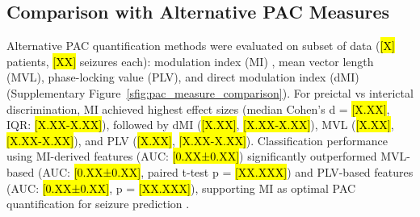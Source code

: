 \subsection{Comparison with Alternative PAC Measures}
Alternative PAC quantification methods were evaluated on subset of data (\hl{[X]} patients, \hl{[XX]} seizures each): modulation index (MI) \cite{Tort2010MeasuringPCE}, mean vector length (MVL), phase-locking value (PLV), and direct modulation index (dMI) \cite{Scherer2022DirectMIM} (Supplementary Figure~\ref{sfig:pac_measure_comparison}). For preictal vs interictal discrimination, MI achieved highest effect sizes (median Cohen's d = \hl{[X.XX]}, IQR: \hl{[X.XX-X.XX]}), followed by dMI (\hl{[X.XX]}, \hl{[X.XX-X.XX]}), MVL (\hl{[X.XX]}, \hl{[X.XX-X.XX]}), and PLV (\hl{[X.XX]}, \hl{[X.XX-X.XX]}). Classification performance using MI-derived features (AUC: \hl{[0.XX±0.XX]}) significantly outperformed MVL-based (AUC: \hl{[0.XX±0.XX]}, paired t-test p = \hl{[XX.XXX]}) and PLV-based features (AUC: \hl{[0.XX±0.XX]}, p = \hl{[XX.XXX]}), supporting MI as optimal PAC quantification for seizure prediction \cite{Hlsemann2019QuantificationOPA}.

